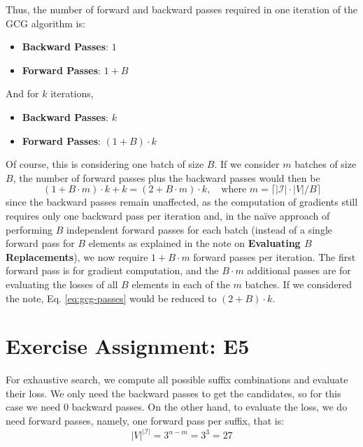 \documentclass{article}
\begin{document}
Thus, the number of forward and backward passes required in one iteration of the GCG algorithm is:
\begin{itemize}
    \item \textbf{Backward Passes}: \(1\)
    \item \textbf{Forward Passes}: \(1 + B\)
\end{itemize}
And for $k$ iterations, 
\begin{itemize}
    \item \textbf{Backward Passes}: \(k\)
    \item \textbf{Forward Passes}: \((1 + B) \cdot k\)
\end{itemize}
Of course, this is considering one batch of size $B$. If we consider $m$ batches of size $B$, the number of forward passes plus the backward passes would then be 
\begin{equation}\label{eq:gcg-passes}
    (1 + B \cdot m) \cdot k + k = (2 + B \cdot m) \cdot k, \quad \text{where } m = \lceil |\mathcal{I}| \cdot |V| / B \rceil
\end{equation}
since the backward passes remain unaffected, as the computation of gradients still requires only one backward pass per iteration and, in the naïve approach of performing \(B\) independent forward passes for each batch (instead of a single forward pass for \(B\) elements as explained in the note on \textbf{Evaluating $B$ Replacements}), we now require $1 + B \cdot m$ forward passes per iteration. The first forward pass is for gradient computation, and the \(B \cdot m\) additional passes are for evaluating the losses of all \(B\) elements in each of the \(m\) batches. If we considered the note, Eq. \eqref{eq:gcg-passes} would be reduced to $(2 + B) \cdot k$.

\section{Exercise Assignment: E5}\label{sec:e5}
For exhaustive search, we compute all possible suffix combinations and evaluate their loss. We only need the backward passes to get the candidates, so for this case we need $0$ backward passes. On the other hand, to evaluate the loss, we do need forward passes, namely, one forward pass per suffix, that is:
\[
    |V|^{|\mathcal{I}|} = 3^{n-m} = 3^3 = 27
\]
\end{document}
